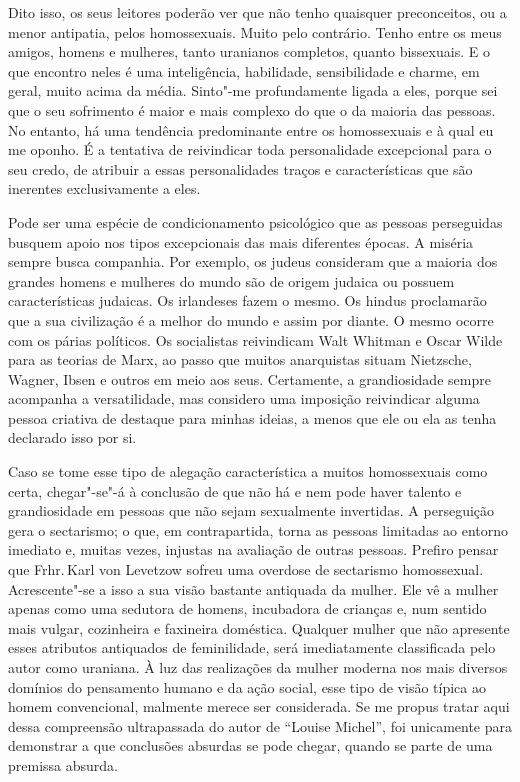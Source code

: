 Dito isso, os seus leitores poderão ver que não tenho quaisquer
preconceitos, ou a menor antipatia, pelos homossexuais. Muito pelo
contrário. Tenho entre os meus amigos, homens e mulheres, tanto
uranianos completos, quanto bissexuais. E o que encontro neles é uma
inteligência, habilidade, sensibilidade e charme, em geral, muito acima
da média. Sinto"-me profundamente ligada a eles, porque sei que o seu
sofrimento é maior e mais complexo do que o da maioria das pessoas. No
entanto, há uma tendência predominante entre os homossexuais e à qual eu
me oponho. É a tentativa de reivindicar toda personalidade excepcional
para o seu credo, de atribuir a essas personalidades traços e
características que são inerentes exclusivamente a eles.

Pode ser uma espécie de condicionamento psicológico que as pessoas
perseguidas busquem apoio nos tipos excepcionais das mais diferentes
épocas. A miséria sempre busca companhia. Por exemplo, os judeus
consideram que a maioria dos grandes homens e mulheres do mundo são de
origem judaica ou possuem características judaicas. Os irlandeses fazem
o mesmo. Os hindus proclamarão que a sua civilização é a melhor do mundo
e assim por diante. O mesmo ocorre com os párias políticos. Os
socialistas reivindicam Walt Whitman e Oscar Wilde para as teorias de
Marx, ao passo que muitos anarquistas situam Nietzsche, Wagner, Ibsen e
outros em meio aos seus. Certamente, a grandiosidade sempre acompanha a
versatilidade, mas considero uma imposição reivindicar alguma pessoa
criativa de destaque para minhas ideias, a menos que ele ou ela as tenha
declarado isso por si.

Caso se tome esse tipo de alegação característica a muitos homossexuais
como certa, chegar"-se"-á à conclusão de que não há e nem pode haver
talento e grandiosidade em pessoas que não sejam sexualmente invertidas.
A perseguição gera o sectarismo; o que, em contrapartida, torna as
pessoas limitadas ao entorno imediato e, muitas vezes, injustas na avaliação
de outras pessoas. Prefiro pensar que Frhr.\,Karl von Levetzow sofreu
uma overdose de sectarismo homossexual. Acrescente"-se a isso a sua
visão bastante antiquada da mulher. Ele vê a mulher apenas como uma sedutora
de homens, incubadora de crianças e, num sentido mais vulgar,
cozinheira e faxineira doméstica. Qualquer mulher que não apresente
esses atributos antiquados de feminilidade, será imediatamente
classificada pelo autor como uraniana. À luz das realizações da mulher
moderna nos mais diversos domínios do pensamento humano e da ação
social, esse tipo de visão típica ao homem convencional,
malmente merece ser considerada. Se me propus tratar aqui dessa
compreensão ultrapassada do autor de ``Louise Michel'', foi unicamente
para demonstrar a que conclusões absurdas se pode chegar, quando se
parte de uma premissa absurda.


